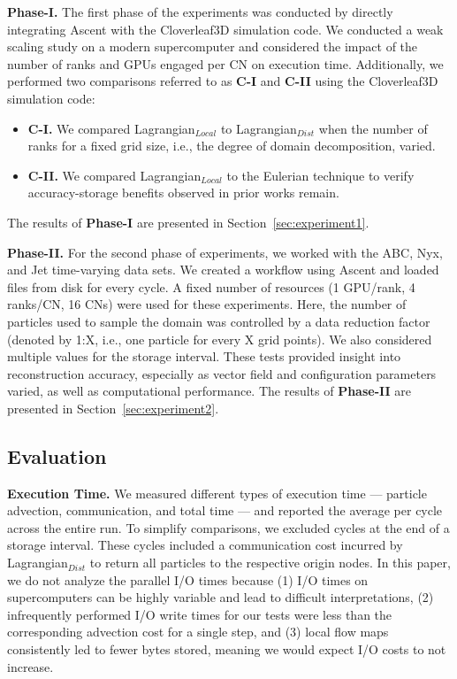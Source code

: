 \textbf{Phase-I.} The first phase of the experiments was conducted by directly integrating Ascent with the Cloverleaf3D simulation code. 
%
We conducted a weak scaling study on a modern supercomputer and considered the impact of the number of ranks and GPUs engaged per CN on execution time. 
%
Additionally, we performed two comparisons referred to as \textbf{C-I} and \textbf{C-II} using the Cloverleaf3D simulation code: 
%
\vspace{-1mm}
\begin{itemize}[leftmargin=*]
\item\textbf{C-I.} We compared Lagrangian$_{Local}$ to Lagrangian$_{Dist}$ when the number of ranks for a fixed grid size, i.e., the degree of domain decomposition, varied.
%
\item\textbf{C-II.} We compared Lagrangian$_{Local}$ to the Eulerian technique to verify accuracy-storage benefits observed in prior works remain. 
\vspace{-4mm}
\end{itemize}
%
The results of \textbf{Phase-I} are presented in Section~\ref{sec:experiment1}.

\textbf{Phase-II.} For the second phase of experiments, we worked with the ABC, Nyx, and Jet time-varying data sets.
%
We created a workflow using Ascent and loaded files from disk for every cycle.
%
A fixed number of resources (1 GPU/rank, 4 ranks/CN, 16 CNs) were used for these experiments.
%
Here, the number of particles used to sample the domain was controlled by a data reduction factor (denoted by 1:X, i.e., one particle for every X grid points). 
%
We also considered multiple values for the storage interval. 
%
These tests provided insight into reconstruction accuracy, especially as vector field and configuration parameters varied, as well as computational performance. 
%
The results of \textbf{Phase-II} are presented in Section~\ref{sec:experiment2}.


\vspace{-2mm}
\subsection{Evaluation}
\label{sec:metrics}
\textbf{Execution Time.} We measured different types of execution time --- particle advection, communication, and total time --- and reported the average per cycle across the entire run.
%
To simplify comparisons, we excluded cycles at the end of a storage interval. 
%
These cycles included a communication cost incurred by Lagrangian$_{Dist}$ to return all particles to the respective origin nodes. 
%
{In this paper, we do not analyze the parallel I/O times because (1) I/O times on supercomputers can be highly variable and lead to difficult interpretations, (2) infrequently performed I/O write times for our tests were less than the corresponding advection cost for a single step, and (3) local flow maps consistently led to fewer bytes stored, meaning we would expect I/O costs to not increase.}

